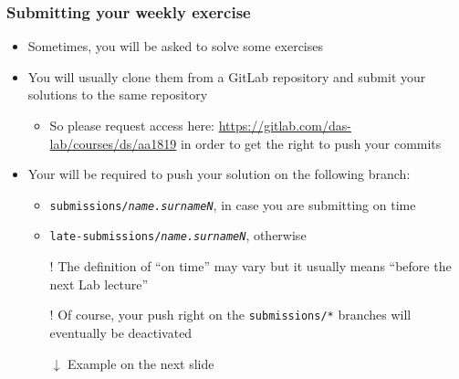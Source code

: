 \documentclass[handout]{beamer}\mode<presentation>{\usetheme{AMSCesenaBleu}}
\begin{document}
\begin{frame}%
\frametitle{Submitting your weekly exercise}

    \begin{itemize}

        \item Sometimes, you will be asked to solve some exercises
        
        \item You will usually clone them from a GitLab repository and \alert{submit your solutions to the same repository}
        \begin{itemize}
            \item So please request access here: \url{https://gitlab.com/das-lab/courses/ds/aa1819} in order to get the right to push your commits
        \end{itemize}
        
        \item Your will be required to push your solution on the following \alert{branch}:
        \begin{itemize}
            \item \texttt{submissions/\alert{\textit{name.surnameN}}}, in case you are submitting on time
            \item \texttt{late-submissions/\alert{\textit{name.surnameN}}}, otherwise
            
            \vspace{.3cm}
        
            \item[!] The definition of ``on time'' may vary but it usually means ``before the next Lab lecture''
            
            \item[!] Of course, your push right on the \texttt{submissions/*} branches will eventually be deactivated
            
            \vspace{.3cm}
            
            \item[$\downarrow$] Example on the next slide

        \end{itemize}

    \end{itemize}
\end{frame}
\end{document}
